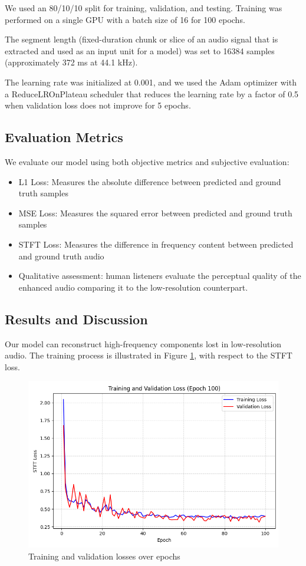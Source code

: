 \documentclass{article}
\begin{document}
We used an 80/10/10 split for training, validation, and testing. Training was performed on a single GPU with a batch size of 16 for 100 epochs.

The segment length (fixed-duration chunk or slice of an audio signal that is extracted and used as an input unit for a model) was set to 16384 samples (approximately 372 ms at 44.1 kHz).

The learning rate was initialized at 0.001, and we used the Adam optimizer with a ReduceLROnPlateau scheduler that reduces the learning rate by a factor of 0.5 when validation loss does not improve for 5 epochs.

\subsection{Evaluation Metrics}
We evaluate our model using both objective metrics and subjective evaluation:
\begin{itemize}
    \item L1 Loss: Measures the absolute difference between predicted and ground truth samples
    \item MSE Loss: Measures the squared error between predicted and ground truth samples
    \item STFT Loss: Measures the difference in frequency content between predicted and ground truth audio
    \item Qualitative assessment: human listeners evaluate the perceptual quality of the enhanced audio comparing it to the low-resolution counterpart.
\end{itemize}

\subsection{Results and Discussion}
Our model can reconstruct high-frequency components lost in low-resolution audio. 
The training process is illustrated in Figure \ref{fig:training}, with respect to the STFT loss.

\begin{figure}[!htb]
    \centering
    \includegraphics[width=1\linewidth]{images/training.png}
    \vspace{-0.7cm} %
    \caption{Training and validation losses over epochs}
    \label{fig:training}
\end{figure}
\end{document}
